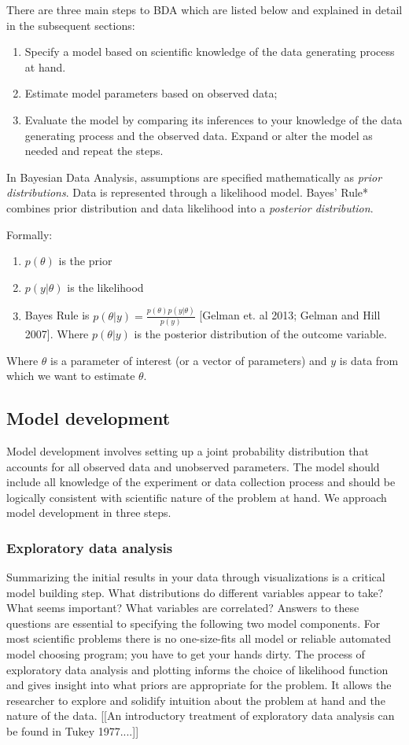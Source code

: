 \documentclass{article}
\begin{document}
There are three main steps to BDA which are listed below and explained in detail in the subsequent sections:
\begin{enumerate}
\item Specify a model based on scientific knowledge of the data generating process at hand.
\item Estimate model parameters based on observed data;
\item Evaluate the model by comparing its inferences to your knowledge of the data generating process and the observed data.  Expand or alter the model as needed and repeat the steps.
\end{enumerate}

In Bayesian Data Analysis, assumptions are specified mathematically as \textit{prior distributions}.  Data is represented through a likelihood model. Bayes' Rule* combines prior distribution and data likelihood into a \textit{posterior distribution}.  

Formally:
\begin{enumerate}
\item $p(\theta)$ is the prior
\item $p(y | \theta)$ is the likelihood
\item Bayes Rule is ${p(\theta|y) = \frac{ p(\theta) p(y |\theta)}{p(y)}}$  [Gelman et. al 2013; Gelman and Hill 2007]. Where ${p(\theta|y)}$ is the posterior distribution of the outcome variable.
\end{enumerate}

Where $\theta$ is a parameter of interest (or a vector of parameters) and $y$ is data from which we want to estimate $\theta$.

\subsection{Model development}
Model development involves setting up a joint probability distribution that accounts for all observed data and unobserved parameters. The model should include all knowledge of the experiment or data collection process and should be logically consistent with scientific nature of the problem at hand. We approach model development in three steps.

\subsubsection{Exploratory data analysis}
Summarizing the initial results in your data through visualizations is a critical model building step. What distributions do different variables appear to take?  What seems important?  What variables are correlated?  Answers to these questions are essential to specifying the following two model components.  For most scientific problems there is no one-size-fits all model or reliable automated model choosing program; you have to get your hands dirty. The process of exploratory data analysis and plotting informs the choice of likelihood function and gives insight into what priors are appropriate for the problem. It allows the researcher to explore and solidify intuition about the problem at hand and the nature of the data. [[An introductory treatment of exploratory data analysis can be found in Tukey 1977....]]
\end{document}
